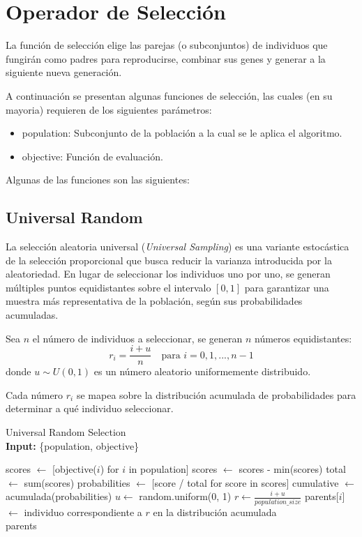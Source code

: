 \chapter{Operador de Selección}

La función de selección elige las parejas (o subconjuntos) de individuos que fungirán como padres para reproducirse, combinar sus genes y generar a la siguiente nueva generación. 

A continuación se presentan algunas funciones de selección, las cuales (en su mayoria) requieren de los siguientes parámetros:
\begin{itemize}
	\item population: Subconjunto de la población a la cual se le aplica el algoritmo.
	\item objective: Función de evaluación.
\end{itemize}

Algunas de las funciones son las siguientes:

\section{Universal Random}

La selección aleatoria universal (\textit{Universal Sampling}) es una variante estocástica de la selección proporcional que busca reducir la varianza introducida por la aleatoriedad. En lugar de seleccionar los individuos uno por uno, se generan múltiples puntos equidistantes sobre el intervalo $[0,1]$ para garantizar una muestra más representativa de la población, según sus probabilidades acumuladas.

Sea $n$ el número de individuos a seleccionar, se generan $n$ números equidistantes:
\[
r_i = \frac{i + u}{n} \quad \text{para } i = 0, 1, ..., n-1
\]
donde $u \sim U(0,1)$ es un número aleatorio uniformemente distribuido.

Cada número $r_i$ se mapea sobre la distribución acumulada de probabilidades para determinar a qué individuo seleccionar.

\begin{algorithm}[H]
	\caption{Universal Random Selection \\ \textbf{Input:} \{population, objective\}}
	\begin{algorithmic}[1]
		\State scores $\gets$ [objective($i$) for $i$ in population]
		\State scores $\gets$ scores - min(scores) 
		\EndIf
		\State total $\gets$ sum(scores)
		\State probabilities $\gets$ [score / total for score in scores]
		\State cumulative $\gets$ acumulada(probabilities)
		\State $u \gets$ random.uniform(0, 1)
		\State $r \gets \frac{i + u}{population\_size}$
		\State parents[$i$] $\gets$ individuo correspondiente a $r$ en la distribución acumulada
		\EndFor \\
		\Return parents
	\end{algorithmic}
	\label{alg:universal_random}
\end{algorithm}

